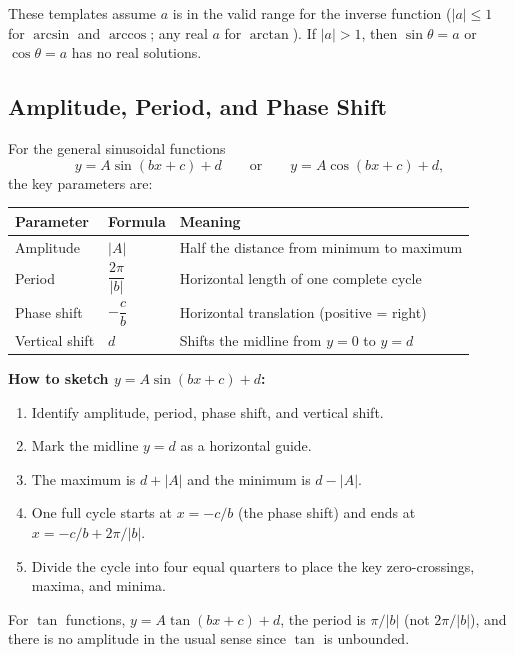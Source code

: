 \documentclass[12pt]{article}
\newenvironment{remark}[1][]{%
  \begin{remarkbox}[title={\bfseries Remark~\thetcbcounter\ifx\relax#1\relax\else\ (#1)\fi}]%
}{%
  \end{remarkbox}%
}
\begin{document}
\begin{remark}
These templates assume $a$ is in the valid range for the inverse function
($|a| \le 1$ for $\arcsin$ and $\arccos$; any real $a$ for $\arctan$).
If $|a| > 1$, then $\sin\theta = a$ or $\cos\theta = a$ has no real solutions.
\end{remark}

\subsection{Amplitude, Period, and Phase Shift}

For the general sinusoidal functions
\[
y = A\sin(bx + c) + d \qquad \text{or} \qquad y = A\cos(bx + c) + d,
\]
the key parameters are:

\begin{center}
\renewcommand{\arraystretch}{1.5}
\begin{tabular}{|l|l|l|}
\hline
\textbf{Parameter} & \textbf{Formula} & \textbf{Meaning} \\
\hline
Amplitude & $|A|$ & Half the distance from minimum to maximum \\
Period & $\dfrac{2\pi}{|b|}$ & Horizontal length of one complete cycle \\
Phase shift & $-\dfrac{c}{b}$ & Horizontal translation (positive = right) \\
Vertical shift & $d$ & Shifts the midline from $y=0$ to $y=d$ \\
\hline
\end{tabular}
\end{center}

\medskip
\textbf{How to sketch $y = A\sin(bx + c) + d$:}
\begin{enumerate}[leftmargin=*]
  \item Identify amplitude, period, phase shift, and vertical shift.
  \item Mark the midline $y = d$ as a horizontal guide.
  \item The maximum is $d + |A|$ and the minimum is $d - |A|$.
  \item One full cycle starts at $x = -c/b$ (the phase shift) and ends at
        $x = -c/b + 2\pi/|b|$.
  \item Divide the cycle into four equal quarters to place the key
        zero-crossings, maxima, and minima.
\end{enumerate}

\begin{remark}
For $\tan$ functions, $y = A\tan(bx + c) + d$, the period is $\pi/|b|$
(not $2\pi/|b|$), and there is no amplitude in the usual sense since $\tan$ is
unbounded.
\end{remark}
\end{document}

